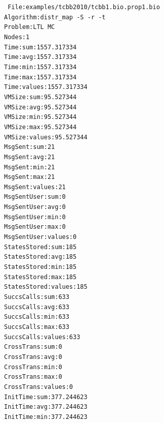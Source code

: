 \documentclass[11pt,final,oneside]{fithesis}
\begin{document}
{\tt\noindent
File:examples/tcbb2010/tcbb1.bio.prop1.bio\\
Algorithm:distr\_map -S -r -t\\
Problem:LTL MC\\
Nodes:1\\
Time:sum:1557.317334\\
Time:avg:1557.317334\\
Time:min:1557.317334\\
Time:max:1557.317334\\
Time:values:1557.317334\\
VMSize:sum:95.527344\\
VMSize:avg:95.527344\\
VMSize:min:95.527344\\
VMSize:max:95.527344\\
VMSize:values:95.527344\\
MsgSent:sum:21\\
MsgSent:avg:21\\
MsgSent:min:21\\
MsgSent:max:21\\
MsgSent:values:21\\
MsgSentUser:sum:0\\
MsgSentUser:avg:0\\
MsgSentUser:min:0\\
MsgSentUser:max:0\\
MsgSentUser:values:0\\
StatesStored:sum:185\\
StatesStored:avg:185\\
StatesStored:min:185\\
StatesStored:max:185\\
StatesStored:values:185\\
SuccsCalls:sum:633\\
SuccsCalls:avg:633\\
SuccsCalls:min:633\\
SuccsCalls:max:633\\
SuccsCalls:values:633\\
CrossTrans:sum:0\\
CrossTrans:avg:0\\
CrossTrans:min:0\\
CrossTrans:max:0\\
CrossTrans:values:0\\
InitTime:sum:377.244623\\
InitTime:avg:377.244623\\
InitTime:min:377.244623\\
}
\end{document}
